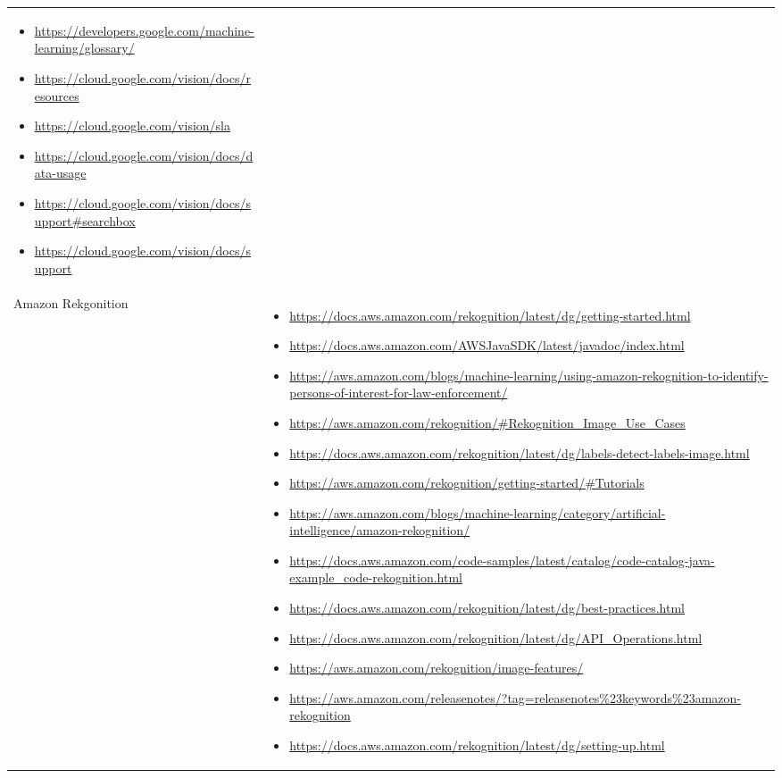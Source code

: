 {\begin{longtable}{p{.2\linewidth}|p{.725\linewidth}}
\begin{itemize}[label=,leftmargin=10pt,topsep=0pt,partopsep=0pt,noitemsep,nolistsep,itemindent=-10pt]
\item \url{https://developers.google.com/machine-learning/glossary/}
\item \url{https://cloud.google.com/vision/docs/resources}
\item \url{https://cloud.google.com/vision/sla}
\item \url{https://cloud.google.com/vision/docs/data-usage}
\item \url{https://cloud.google.com/vision/docs/support#searchbox}
\item \url{https://cloud.google.com/vision/docs/support}
    \end{itemize}\\
    Amazon Rekgonition &
    \vspace{-1.75mm}
    \begin{itemize}[label=,leftmargin=10pt,topsep=0pt,partopsep=0pt,noitemsep,nolistsep,itemindent=-10pt]
\item \url{https://docs.aws.amazon.com/rekognition/latest/dg/getting-started.html}
\item \url{https://docs.aws.amazon.com/AWSJavaSDK/latest/javadoc/index.html}
\item \url{https://aws.amazon.com/blogs/machine-learning/using-amazon-rekognition-to-identify-persons-of-interest-for-law-enforcement/}
\item \url{https://aws.amazon.com/rekognition/#Rekognition_Image_Use_Cases}
\item \url{https://docs.aws.amazon.com/rekognition/latest/dg/labels-detect-labels-image.html}
\item \url{https://aws.amazon.com/rekognition/getting-started/#Tutorials}
\item \url{https://aws.amazon.com/blogs/machine-learning/category/artificial-intelligence/amazon-rekognition/}
\item \url{https://docs.aws.amazon.com/code-samples/latest/catalog/code-catalog-java-example_code-rekognition.html}
\item \url{https://docs.aws.amazon.com/rekognition/latest/dg/best-practices.html}
\item \url{https://docs.aws.amazon.com/rekognition/latest/dg/API_Operations.html}
\item \url{https://aws.amazon.com/rekognition/image-features/}
\item \url{https://aws.amazon.com/releasenotes/?tag=releasenotes%23keywords%23amazon-rekognition}
\item \url{https://docs.aws.amazon.com/rekognition/latest/dg/setting-up.html}

\end{itemize}
\end{longtable}}
